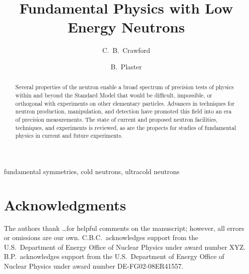\documentclass[final,3p]{elsarticle}
\begin{document}
\begin{frontmatter}

\title{Fundamental Physics with Low Energy Neutrons}

\author{C.\ B.\ Crawford}
\address{Department of Physics and Astronomy, University of Kentucky,
Lexington, KY 40506, USA}
\author{B.\ Plaster}
\address{Department of Physics and Astronomy, University of Kentucky,
Lexington, KY 40506, USA}

\begin{abstract}
Several properties of the neutron enable a broad spectrum of precision
tests of physics within and beyond the Standard Model that would be
difficult, impossible, or orthogonal with experiments on other
elementary particles.  Advances in techniques for neutron production,
manipulation, and detection have promoted this field into an era of
precision measurements.  The state of current and proposed neutron
facilities, techniques, and experiments is reviewed, as are the
propects for studies of fundamental physics in current and future
experiments.
\end{abstract}

\begin{keyword}
fundamental symmetries, cold neutrons, ultracold neutrons
\end{keyword}

\end{frontmatter}

\tableofcontents










\section*{Acknowledgments}
The authors thank \ldots for helpful comments on the manuscript;
however, all errors or omissions are our own.  C.B.C.\ acknowledges
support from the U.S.\ Department of Energy Office of Nuclear Physics
under award number XYZ.  B.P.\ acknowledges support from the
U.S.\ Department of Energy Office of Nuclear Physics under award
number DE-FG02-08ER41557.


\end{document}
